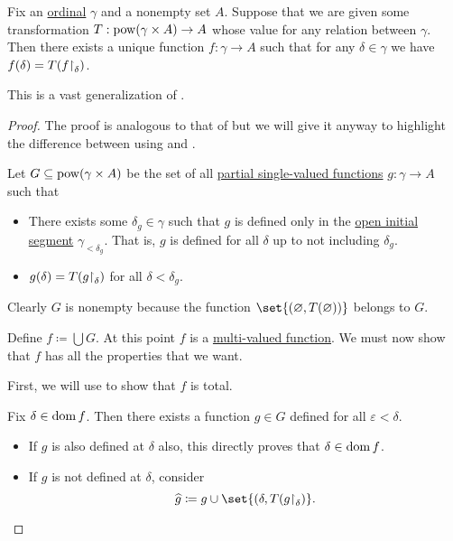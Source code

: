 \begin{theorem}\label{thm:bounded_transfinite_recursion}
  Fix an \hyperref[def:ordinal]{ordinal} \( \gamma \) and a nonempty set \( A \). Suppose that we are given some transformation \( T: \operatorname{pow}(\gamma \times A) \to A \) whose value for any relation between \( \gamma \). Then there exists a unique function \( f: \gamma \to A \) such that for any \( \delta \in \gamma \) we have \( f(\delta) = T(f{\upharpoonright}_\delta) \).

  This is a vast generalization of .
\end{theorem}
\begin{proof}
  The proof is analogous to that of  but we will give it anyway to highlight the difference between using  and .

  Let \( G \subseteq \operatorname{pow}(\gamma \times A) \) be the set of all \hyperref[def:partial_function]{partial single-valued functions} \( g: \gamma \to A \) such that
  \begin{itemize}
    \item There exists some \( \delta_g \in \gamma \) such that \( g \) is defined only in the \hyperref[def:poset_interval/ray]{open initial segment} \( \gamma_{< \delta_g} \). That is, \( g \) is defined for all \( \delta \) up to not including \( \delta_g \).

    \item \( g(\delta) = T(g{\upharpoonright}_\delta) \) for all \( \delta < \delta_g \).
  \end{itemize}

  Clearly \( G \) is nonempty because the function \( \set{ (\varnothing, T(\varnothing)) } \) belongs to \( G \).

  Define \( f \coloneqq \bigcup G \). At this point \( f \) is a \hyperref[def:multi_valued_function]{multi-valued function}. We must now show that \( f \) has all the properties that we want.

   First, we will use  to show that \( f \) is total.

  Fix \( \delta \in \operatorname{dom} f \). Then there exists a function \( g \in G \) defined for all \( \varepsilon < \delta \).

  \begin{itemize}
    \item If \( g \) is also defined at \( \delta \) also, this directly proves that \( \delta \in \operatorname{dom} f \).
    \item If \( g \) is not defined at \( \delta \), consider
    \begin{equation*}
      \widehat g \coloneqq g \cup \set{ (\delta, T(g\restr_\delta) }.
    \end{equation*}


\end{itemize}
\end{proof}
